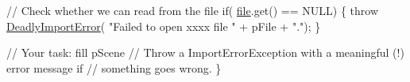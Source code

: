 \begin{DoxyCode}
    \textcolor{comment}{// Check whether we can read from the file}
    \textcolor{keywordflow}{if}( \hyperlink{structfile}{file}.get() == NULL) \{
        \textcolor{keywordflow}{throw} \hyperlink{class_deadly_import_error}{DeadlyImportError}( \textcolor{stringliteral}{"Failed to open xxxx file "} + pFile + \textcolor{stringliteral}{"."});
    \}
    
    \textcolor{comment}{// Your task: fill pScene}
    \textcolor{comment}{// Throw a ImportErrorException with a meaningful (!) error message if }
    \textcolor{comment}{// something goes wrong.}
\}
\end{DoxyCode}
 